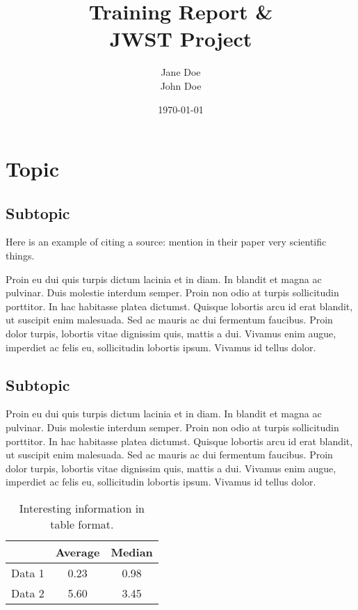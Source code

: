 \documentclass{stsci_report}
\title{\textbf{Training Report \& \\ JWST Project}}
\author{Jane Doe \\ John Doe}
\date{\today}
\begin{document}
\maketitle


\section*{Topic} \label{s:topic}

\subsection*{Subtopic} \label{ss:subtopic}

Here is an example of citing a source: \textcite{Kruit2000} mention in their paper very scientific things.


Proin eu dui quis turpis dictum lacinia et in diam. In blandit et magna ac pulvinar. Duis molestie interdum semper. Proin non odio at turpis sollicitudin porttitor. In hac habitasse platea dictumst. Quisque lobortis arcu id erat blandit, ut suscipit enim malesuada. Sed ac mauris ac dui fermentum faucibus. Proin dolor turpis, lobortis vitae dignissim quis, mattis a dui. Vivamus enim augue, imperdiet ac felis eu, sollicitudin lobortis ipsum. Vivamus id tellus dolor.

\subsection*{Subtopic}

Proin eu dui quis turpis dictum lacinia et in diam. In blandit et magna ac pulvinar. Duis molestie interdum semper. Proin non odio at turpis sollicitudin porttitor. In hac habitasse platea dictumst. Quisque lobortis arcu id erat blandit, ut suscipit enim malesuada. Sed ac mauris ac dui fermentum faucibus. Proin dolor turpis, lobortis vitae dignissim quis, mattis a dui. Vivamus enim augue, imperdiet ac felis eu, sollicitudin lobortis ipsum. Vivamus id tellus dolor.

\begin{table}[h]
  \centering
    \caption{Interesting information in table format.}
    \def\arraystretch{1.25}
    \begin{tabular}{l | c c}
    \hline
    \hline
    & Average & Median \\
    \hline
    Data 1 & 0.23 & 0.98 \\
    Data 2 & 5.60  &  3.45\\
    \hline
    \end{tabular}
    \label{tab:table_one} 
\end{table}
\end{document}
